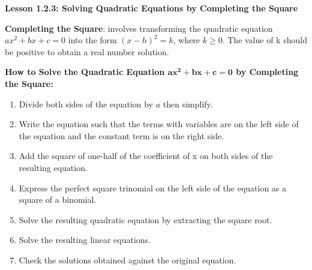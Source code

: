 \begin{center}
\textbf{Lesson 1.2.3: Solving Quadratic Equations by Completing the Square}
\end{center}


\textbf{Completing the Square}: involves transforming the quadratic equation $ax^2 + bx + c = 0$ into the form $(x - h)^2 = k$, where $k \geq 0$.  The value of k should be positive to obtain a real number solution.

\textbf{How to Solve the Quadratic Equation $\boldsymbol{ax^2 + bx + c = 0}$ by Completing the Square:}
\begin{enumerate}[label = \color{blue}\arabic*. ]
   \item Divide both sides of the equation by $a$ then simplify.
   \item Write the equation such that the terms with variables are on the left side of the equation and the constant term is on the right side.
   \item Add the square of one-half of the coefficient of x on both sides of the resulting equation.
   \item Express the perfect square trinomial on the left side of the equation as a square of a binomial.
   \item Solve the resulting quadratic equation by extracting the square root.
   \item Solve the resulting linear equations.
   \item Check the solutions obtained against the original equation.
  
\end{enumerate}
				
				
